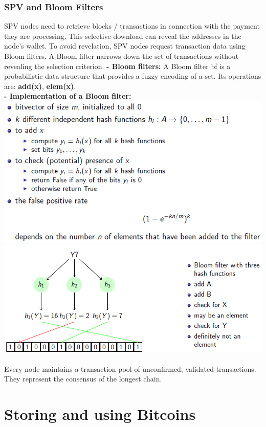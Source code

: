 \documentclass{article}
\begin{document}
\subsubsection{SPV and Bloom Filters}
SPV nodes need to retrieve blocks / transactions in connection with the payment they are processing. This selective download can reveal the addresses in the node's wallet. To avoid revelation, SPV nodes request transaction data using Bloom filters. A Bloom filter narrows down the set of transactions without revealing the selection criterion.
\textbf{- Bloom filters: }A Bloom filter bf is a probabilistic data-structure that provides a fuzzy encoding of a set. Its operations are: \textbf{add(x)}, \textbf{elem(x)}.\\
\textbf{- Implementation of a Bloom filter: }\\
\includegraphics[scale=0.6]{34.png}
\includegraphics[scale=0.6]{35.png}\\\\
Every node maintains a transaction pool of unconfirmed, validated transactions. They represent the consensus of the longest chain.

\section{Storing and using Bitcoins}
\end{document}
